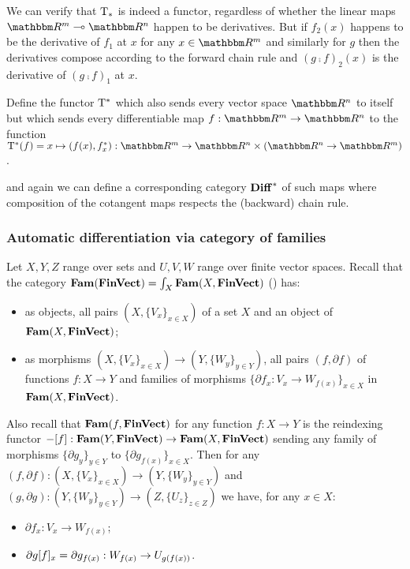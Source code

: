 We can verify that $\mathrm{T}_*$ is indeed a functor, regardless of whether the linear maps $\RR^m \linearto
\RR^n$ happen to be derivatives. But if $f_2(x)$ happens to be the derivative of $f_1$ at $x$ for any $x \in
\RR^m$ and similarly for $g$ then the derivatives compose according to the forward chain rule and $(g \comp
f)_2(x)$ is the derivative of $(g \comp f)_1$ at $x$.

\begin{definition}
Define the functor $\mathrm{T}^*$ which also sends every vector space $\RR^n$ to itself but which sends every
differentiable map $f: \RR^m \to \RR^n$ to the function $\tangents^*(f) = x \mapsto (f(x), \pullf{f}_x): \RR^m
\to \RR^n \times (\RR^n \to \RR^m)$.
\end{definition}

\noindent and again we can define a corresponding category $\mathbf{Diff}^*$ of such maps where composition of the
cotangent maps respects the (backward) chain rule.

\subsubsection{Automatic differentiation via category of families}

Let $X, Y, Z$ range over sets and $U, V, W$ range over finite vector spaces. Recall that the category
$\mathbf{Fam}(\mathbf{FinVect}) = \int_{X}\mathbf{Fam}(X, \mathbf{FinVect})$ () has:
\begin{itemize}
\item as objects, all pairs $(X, \{V_x\}_{x \in X})$ of a set $X$ and an object of $\mathbf{Fam}(X,\mathbf{FinVect})$;
\item as morphisms $(X, \{V_x\}_{x \in X}) \to (Y, \{W_y\}_{y \in Y})$, all pairs $(f, \partial f)$ of
functions $f: X \to Y$ and families of morphisms $\{\partial f_x: V_x \to W_{f(x)}\}_{x \in X}$
in $\mathbf{Fam}(X,\mathbf{FinVect})$.
\end{itemize}

Also recall that $\mathbf{Fam}(f, \mathbf{FinVect})$ for any function $f: X \to Y$ is the reindexing functor $-[f]:
\mathbf{Fam}(Y, \mathbf{FinVect}) \to \mathbf{Fam}(X, \mathbf{FinVect})$ sending any family of morphisms $\{\partial g_y\}_{y \in Y}$ to
$\{\partial g_{f(x)}\}_{x \in X}$. Then for any $(f, \partial f): (X, \{V_x\}_{x \in X}) \to (Y, \{W_y\}_{y
\in Y})$ and $(g, \partial g): (Y, \{W_y\}_{y \in Y}) \to (Z, \{U_z\}_{z \in Z})$ we have, for any $x \in X$:
\begin{itemize}
\item $\partial f_x: V_x \to W_{f(x)}$;
\item $\partial g[f]_x = \partial g_{f(x)}: W_{f(x)} \to U_{g(f(x))}$.
\end{itemize}

